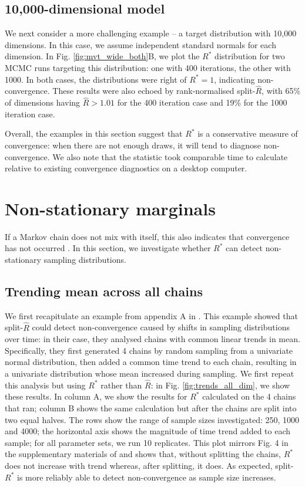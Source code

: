 \documentclass{article}
\begin{document}
\subsection{10,000-dimensional model}
We next consider a more challenging example -- a target distribution with 10,000 dimensions. In this case, we assume independent standard normals for each dimension. In Fig. \ref{fig:mvt_wide_both}B, we plot the $R^*$ distribution for two MCMC runs targeting this distribution: one with 400 iterations, the other with 1000. In both cases, the distributions were right of $R^*=1$, indicating non-convergence. These results were also echoed by rank-normalised split-$\widehat{R}$, with 65\% of dimensions having $\widehat{R}>1.01$ for the 400 iteration case and 19\% for the 1000 iteration case.

Overall, the examples in this section suggest that $R^*$ is a conservative measure of convergence: when there are not enough draws, it will tend to diagnose non-convergence. We also note that the statistic took comparable time to calculate relative to existing convergence diagnostics on a desktop computer.

\section{Non-stationary marginals}\label{sec:non-stationary}
If a Markov chain does not mix with itself, this also indicates that convergence has not occurred \citep{gelman2013bayesian}. In this section, we investigate whether $R^*$ can detect non-stationary sampling distributions.

\subsection{Trending mean across all chains}\label{sec:non-stationary_chains}
We first recapitulate an example from appendix A in \cite{vehtari2019rank}. This example showed that split-$\widehat{R}$ could detect non-convergence caused by shifts in sampling distributions over time: in their case, they analysed chains with common linear trends in mean. Specifically, they first generated 4 chains by random sampling from a univariate normal distribution, then added a common time trend to each chain, resulting in a univariate distribution whose mean increased during sampling. We first repeat this analysis but using $R^*$ rather than $\widehat{R}$: in Fig. \ref{fig:trends_all_dim}, we show these results. In column A, we show the results for $R^*$ calculated on the 4 chains that ran; column B shows the same calculation but after the chains are split into two equal halves. The rows show the range of sample sizes investigated: 250, 1000 and 4000; the horizontal axis shows the magnitude of time trend added to each sample; for all parameter sets, we run 10 replicates. This plot mirrors Fig. 4 in the supplementary materials of \cite{vehtari2019rank} and shows that, without splitting the chains, $R^*$ does not increase with trend whereas, after splitting, it does. As expected, split-$R^*$ is more reliably able to detect non-convergence as sample size increases.
\end{document}

